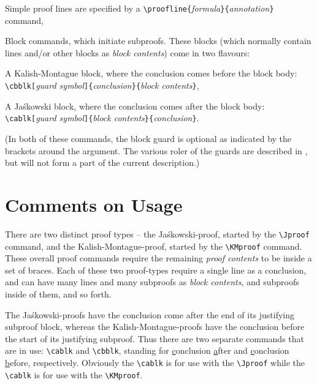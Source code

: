 \documentclass{article}
\newcommand{\Jas}{Ja\'skowski }
\newcommand{\JasA}{Ja\'skowski}
\newcommand{\KMa}{Kalish-Montague}
\begin{document}
\begin{compactenum}
\item Simple proof lines are specified by a \verb+\proofline{+\emph{formula}\verb+}{+\emph{annotation}\verb+}+ command, 
\item Block commands, which initiate subproofs.  These blocks (which normally contain lines and/or other blocks as \emph{block contents}) come in two flavours: 
\begin{compactenum}[(i)]
\item A Kalish-Montague block, where  the conclusion comes before the block body: \\ \verb+\cbblk[+\emph{guard symbol}\verb+]{+\emph{conclusion}\verb+}{+\emph{block contents}\verb+}+, 
\item A \Jas block, where the conclusion comes after the block body: \\ \verb+\cablk[+\emph{guard symbol}\verb+]{+\emph{block contents}\verb+}{+\emph{conclusion}\verb+}+. 
\item (In both of these commands, the block guard is optional as indicated by the brackets around the argument.  The various roler of the guards are described in {\color{red}{this paper -- link to the JasKMnatded.pdf paper}}, but will not form a part of the current description.)
\end{compactenum}
\end{compactenum}

\section{Comments on Usage}
There are two distinct proof types -- the \JasA-proof, started by the \verb+\Jproof+ command, and the \KMa-proof, started by the \verb+\KMproof+ command.  These overall proof commands require the remaining \emph{proof contents} to be inside a set of braces.  Each of these two proof-types require a single line as a conclusion, and can have many lines and many subproofs as \emph{block contents}, and subproofs inside of them, and so forth.

The \JasA-proofs have the conclusion come after the end of its justifying subproof block, whereas the \KMa-proofs have the conclusion before the start of its justifying subproof.  Thus there are two separate commands that are in use: \verb+\cablk+ and \verb+\cbblk+, standing for \uline{c}onclusion \uline{a}fter and \uline{c}onclusion \uline{b}efore, respectively.  Obviously the \verb+\cablk+ is for use with the \verb+\Jproof+ while the \verb+\cablk+ is for use with the \verb+\KMproof+.
\end{document}
